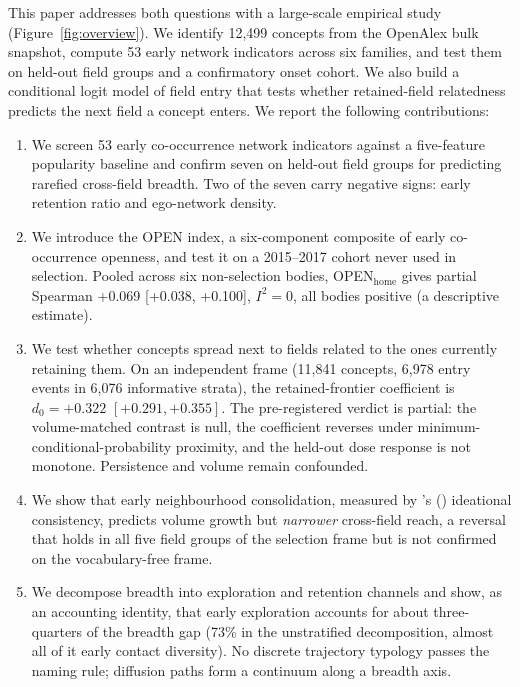 \documentclass[11pt,letterpaper]{article}
\begin{document}
This paper addresses both questions with a large-scale empirical study (Figure~\ref{fig:overview}). We identify 12{,}499 concepts from the OpenAlex bulk snapshot, compute 53 early network indicators across six families, and test them on held-out field groups and a confirmatory onset cohort. We also build a conditional logit model of field entry that tests whether retained-field relatedness predicts the next field a concept enters. We report the following contributions:

\begin{enumerate}
    \item We screen 53 early co-occurrence network indicators against a five-feature popularity baseline and confirm seven on held-out field groups for predicting rarefied cross-field breadth. Two of the seven carry negative signs: early retention ratio and ego-network density.
    \item We introduce the OPEN index, a six-component composite of early co-occurrence openness, and test it on a 2015--2017 cohort never used in selection. Pooled across six non-selection bodies, OPEN$_{\text{home}}$ gives partial Spearman +0.069 [+0.038, +0.100], $I^2 = 0$, all bodies positive (a descriptive estimate).
    \item We test whether concepts spread next to fields related to the ones currently retaining them. On an independent frame (11,841 concepts, 6,978 entry events in 6,076 informative strata), the retained-frontier coefficient is $d_0 = +0.322$ $[+0.291, +0.355]$. The pre-registered verdict is partial: the volume-matched contrast is null, the coefficient reverses under minimum-conditional-probability proximity, and the held-out dose response is not monotone. Persistence and volume remain confounded.
    \item We show that early neighbourhood consolidation, measured by \citeauthor{Cheng2023}'s (\citeyear{Cheng2023}) ideational consistency, predicts volume growth but \emph{narrower} cross-field reach, a reversal that holds in all five field groups of the selection frame but is not confirmed on the vocabulary-free frame.
    \item We decompose breadth into exploration and retention channels and show, as an accounting identity, that early exploration accounts for about three-quarters of the breadth gap (73\% in the unstratified decomposition, almost all of it early contact diversity). No discrete trajectory typology passes the naming rule; diffusion paths form a continuum along a breadth axis.
\end{enumerate}
\end{document}
